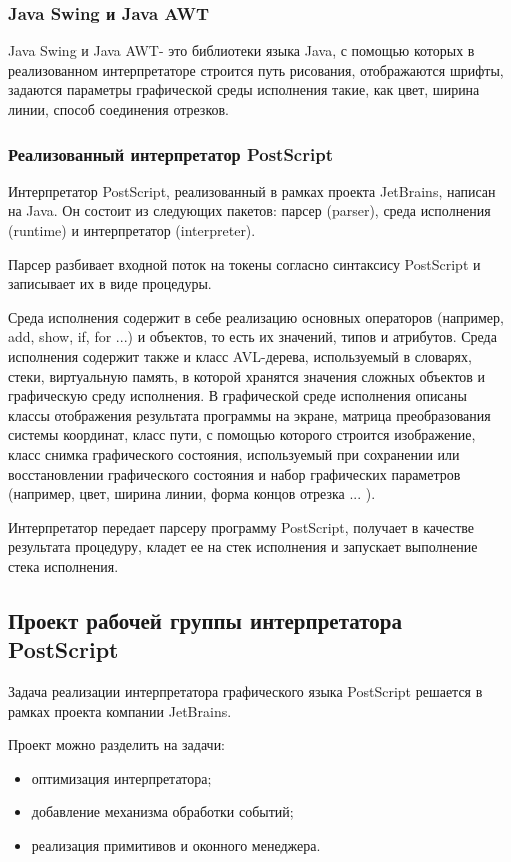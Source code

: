 \documentclass[14pt]{extarticle}
\begin{document}
		\subsubsection*{Java Swing и Java AWT}
		Java Swing и Java AWT- это библиотеки языка Java, с помощью которых в реализованном интерпретаторе строится путь рисования, отображаются шрифты, задаются параметры графической среды исполнения такие, как цвет, ширина линии, способ соединения отрезков. 
		\subsubsection*{ Реализованный интерпретатор PostScript }
		Интерпретатор PostScript, реализованный в рамках проекта JetBrains, написан на Java. Он состоит из следующих пакетов: парсер (parser), среда исполнения (runtime) и интерпретатор (interpreter). 
		
		Парсер разбивает входной поток на токены согласно синтаксису PostScript и записывает их в виде процедуры.
		
		Среда исполнения содержит в себе реализацию основных операторов (например, add, show, if, for ...) и объектов, то есть их значений, типов и атрибутов. Среда исполнения содержит также и класс AVL-дерева, используемый в словарях, стеки, виртуальную память, в которой хранятся значения сложных объектов и графическую среду исполнения. В графической среде исполнения описаны классы отображения результата программы на экране, матрица преобразования системы координат, класс пути, с помощью которого строится изображение, класс снимка графического состояния, используемый при сохранении или восстановлении графического состояния и набор графических параметров (например, цвет, ширина линии, форма концов отрезка ... ).
		
		Интерпретатор передает парсеру программу PostScript, получает в качестве результата процедуру, кладет ее на стек исполнения и запускает выполнение стека исполнения.
		
	\subsection{ Проект рабочей группы интерпретатора PostScript }
Задача реализации интерпретатора графического языка PostScript решается в рамках проекта компании JetBrains. 
		
		Проект можно разделить на задачи:
		\begin{itemize}
		\item оптимизация интерпретатора;
		\item добавление механизма обработки событий;
		\item реализация примитивов и оконного менеджера.
		\end{itemize}	
	
\end{document}
